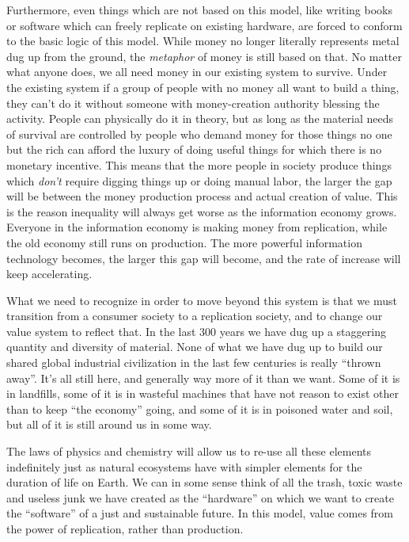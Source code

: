 Furthermore, even things which are not based on this model, like writing
books or software which can freely replicate on existing hardware, are
forced to conform to the basic logic of this model. While money no
longer literally represents metal dug up from the ground, the
\emph{metaphor} of money is still based on that. No matter what anyone
does, we all need money in our existing system to survive. Under the
existing system if a group of people with no money all want to build a
thing, they can't do it without someone with money-creation authority
blessing the activity. People can physically do it in theory, but as
long as the material needs of survival are controlled by people who
demand money for those things no one but the rich can afford the luxury
of doing useful things for which there is no monetary incentive. This
means that the more people in society produce things which \emph{don't}
require digging things up or doing manual labor, the larger the gap will
be between the money production process and actual creation of value.
This is the reason inequality will always get worse as the information
economy grows. Everyone in the information economy is making money from
replication, while the old economy still runs on production. The more
powerful information technology becomes, the larger this gap will
become, and the rate of increase will keep accelerating.

What we need to recognize in order to move beyond this system is that we
must transition from a consumer society to a replication society, and to
change our value system to reflect that. In the last 300 years we have
dug up a staggering quantity and diversity of material. None of what we
have dug up to build our shared global industrial civilization in the
last few centuries is really ``thrown away''. It's all still here, and
generally way more of it than we want. Some of it is in landfills, some
of it is in wasteful machines that have not reason to exist other than
to keep ``the economy'' going, and some of it is in poisoned water and
soil, but all of it is still around us in some way.

The laws of physics and chemistry will allow us to re-use all these
elements indefinitely just as natural ecosystems have with simpler
elements for the duration of life on Earth. We can in some sense think
of all the trash, toxic waste and useless junk we have created as the
``hardware'' on which we want to create the ``software'' of a just and
sustainable future. In this model, value comes from the power of
replication, rather than production.

